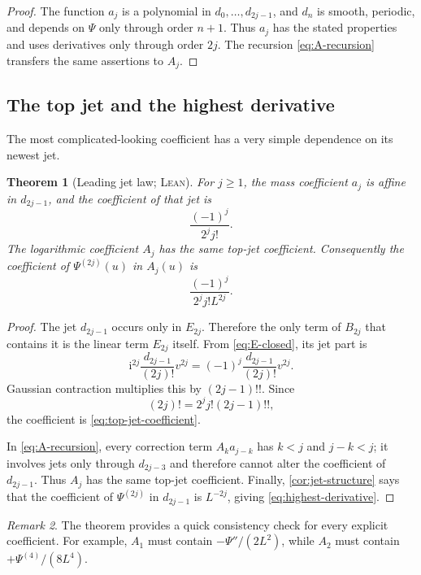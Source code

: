 \documentclass[11pt,oneside]{article}
\newtheorem{theorem}{Theorem}[section]
\theoremstyle{definition}
\theoremstyle{remark}
\newtheorem{remark}[theorem]{Remark}
\newcommand{\ii}{\mathrm i}
\newcommand{\Formalized}{\textsc{Lean}}
\begin{document}
\begin{proof}
The function $a_j$ is a polynomial in
$d_0,\dots,d_{2j-1}$, and $d_n$ is smooth, periodic, and depends on
$\Psi$ only through order $n+1$.  Thus $a_j$ has the stated properties
and uses derivatives only through order $2j$.  The recursion
\eqref{eq:A-recursion} transfers the same assertions to $A_j$.
\end{proof}

\subsection{The top jet and the highest derivative}

The most complicated-looking coefficient has a very simple dependence on
its newest jet.

\begin{theorem}[Leading jet law; \Formalized]
\label{thm:top-jet}
For $j\geq1$, the mass coefficient $a_j$ is affine in $d_{2j-1}$, and
the coefficient of that jet is
\begin{equation}
 \frac{(-1)^j}{2^j j!}. \label{eq:top-jet-coefficient}
\end{equation}
The logarithmic coefficient $A_j$ has the same top-jet coefficient.
Consequently the coefficient of $\Psi^{(2j)}(u)$ in $A_j(u)$ is
\begin{equation}
 \boxed{\frac{(-1)^j}{2^j j!L^{2j}}.}
 \label{eq:highest-derivative}
\end{equation}
\end{theorem}

\begin{proof}
The jet $d_{2j-1}$ occurs only in $E_{2j}$.  Therefore the only term of
$B_{2j}$ that contains it is the linear term $E_{2j}$ itself.  From
\eqref{eq:E-closed}, its jet part is
\[
 \ii^{2j}\frac{d_{2j-1}}{(2j)!}v^{2j}
 =(-1)^j\frac{d_{2j-1}}{(2j)!}v^{2j}.
\]
Gaussian contraction multiplies this by $(2j-1)!!$.  Since
\[
 (2j)!=2^jj!(2j-1)!!,
\]
the coefficient is \eqref{eq:top-jet-coefficient}.

In \eqref{eq:A-recursion}, every correction term
$A_ka_{j-k}$ has $k<j$ and $j-k<j$; it involves jets only through
$d_{2j-3}$ and therefore cannot alter the coefficient of $d_{2j-1}$.
Thus $A_j$ has the same top-jet coefficient.  Finally,
\cref{cor:jet-structure} says that the coefficient of
$\Psi^{(2j)}$ in $d_{2j-1}$ is $L^{-2j}$, giving
\eqref{eq:highest-derivative}.
\end{proof}

\begin{remark}
The theorem provides a quick consistency check for every explicit
coefficient.  For example, $A_1$ must contain
$-\Psi''/(2L^2)$, while $A_2$ must contain
$+\Psi^{(4)}/(8L^4)$.
\end{remark}
\end{document}
